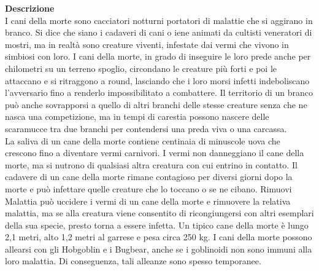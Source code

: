 \begin{multicols}{2}
\textbf{Descrizione}\\
I cani della morte sono cacciatori notturni portatori di malattie che si aggirano in branco. Si dice che siano i cadaveri di cani o iene animati da cultisti veneratori di mostri, ma in realtà sono creature viventi, infestate dai vermi che vivono in simbiosi con loro. I cani della morte, in grado di inseguire le loro prede anche per chilometri su un terreno spoglio, circondano le creature più forti e poi le attaccano e si ritraggono a round, lasciando che i loro morsi infetti indeboliscano l'avversario fino a renderlo impossibilitato a combattere. Il territorio di un branco può anche sovrapporsi a quello di altri branchi delle stesse creature senza che ne nasca una competizione, ma in tempi di carestia possono nascere delle scaramucce tra due branchi per contendersi una preda viva o una carcassa.\\

La saliva di un cane della morte contiene centinaia di minuscole uova che crescono fino a diventare vermi carnivori. I vermi non danneggiano il cane della morte, ma si nutrono di qualsiasi altra creatura con cui entrino in contatto. Il cadavere di un cane della morte rimane contagioso per diversi giorni dopo la morte e può infettare quelle creature che lo toccano o se ne cibano. Rimuovi Malattia può uccidere i vermi di un cane della morte e rimuovere la relativa malattia, ma se alla creatura viene consentito di ricongiungersi con altri esemplari della sua specie, presto torna a essere infetta. Un tipico cane della morte è lungo 2,1 metri, alto 1,2 metri al garrese e pesa circa 250 kg. I cani della morte possono allearsi con gli Hobgoblin e i Bugbear, anche se i goblinoidi non sono immuni alla loro malattia. Di conseguenza, tali alleanze sono spesso temporanee. \\


\end{multicols}
